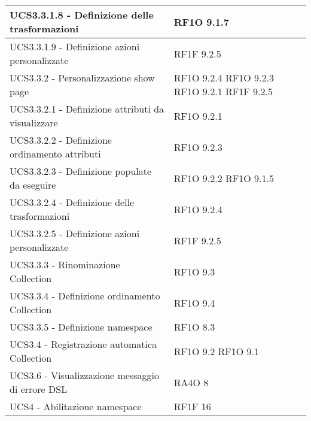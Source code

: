 \begin{center}
\begin{longtable}{ | p{5cm} | p{5cm} |}
            UCS3.3.1.8 - Definizione delle trasformazioni &  RF1O 9.1.7 \newline  \\ \hline      
            UCS3.3.1.9 - Definizione azioni personalizzate &  RF1F 9.2.5 \newline  \\ \hline      
            UCS3.3.2 - Personalizzazione show page &  RF1O 9.2.4 \newline  RF1O 9.2.3 \newline  RF1O 9.2.1  \newline  RF1F 9.2.5 \newline  \\ \hline      
            UCS3.3.2.1 - Definizione attributi da visualizzare &  RF1O 9.2.1  \newline  \\ \hline      
            UCS3.3.2.2 - Definizione ordinamento attributi &  RF1O 9.2.3 \newline  \\ \hline      
            UCS3.3.2.3 - Definizione populate da eseguire &  RF1O 9.2.2  \newline  RF1O 9.1.5 \newline  \\ \hline      
            UCS3.3.2.4 - Definizione delle trasformazioni &  RF1O 9.2.4 \newline  \\ \hline      
            UCS3.3.2.5 - Definizione azioni personalizzate &  RF1F 9.2.5 \newline  \\ \hline      
            UCS3.3.3 - Rinominazione Collection &  RF1O 9.3 \newline  \\ \hline      
            UCS3.3.4 - Definizione ordinamento Collection &  RF1O 9.4 \newline  \\ \hline      
            UCS3.3.5 - Definizione namespace &  RF1O 8.3 \newline  \\ \hline      
            UCS3.4 - Registrazione automatica Collection &  RF1O 9.2 \newline  RF1O 9.1  \newline  \\ \hline      
            UCS3.6 - Visualizzazione messaggio di errore DSL &  RA4O 8 \newline  \\ \hline      
            UCS4 - Abilitazione namespace &  RF1F 16 \newline  \\ \hline      

\end{longtable}
\end{center}
